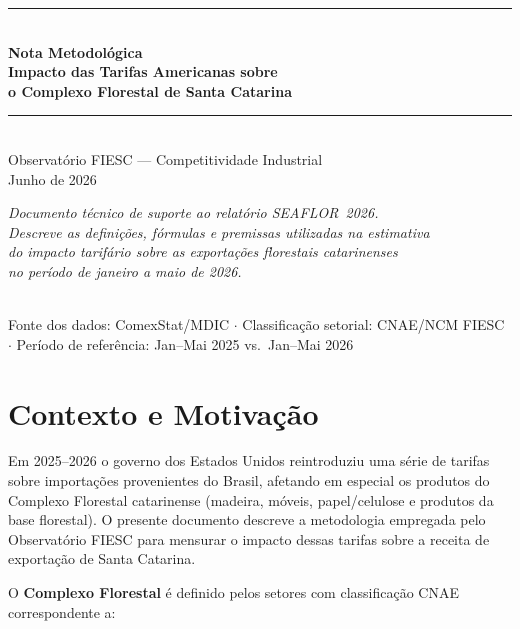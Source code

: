 \documentclass[12pt, a4paper]{article}
\begin{document}
\begin{titlepage}
  \centering
  \vspace*{2cm}
  {\color{azulFIESC}\rule{\linewidth}{2pt}}\\[0.4cm]
  {\LARGE\bfseries\color{azulFIESC}
    Nota Metodológica\\[0.3cm]
    Impacto das Tarifas Americanas sobre\\
    o Complexo Florestal de Santa Catarina
  }\\[0.3cm]
  {\color{azulFIESC}\rule{\linewidth}{1pt}}\\[1.5cm]
  {\large\color{cinzaTexto}
    Observatório FIESC — Competitividade Industrial\\[0.3cm]
    Junho de 2026
  }\\[3cm]
  \begin{minipage}{0.9\textwidth}
    \centering\itshape\color{cinzaTexto}
    Documento técnico de suporte ao relatório SEAFLOR~2026.\\
    Descreve as definições, fórmulas e premissas utilizadas na estimativa\\
    do impacto tarifário sobre as exportações florestais catarinenses\\
    no período de janeiro a maio de 2026.
  \end{minipage}\\[2cm]
  {\footnotesize\color{cinzaTexto}
    Fonte dos dados: ComexStat/MDIC $\cdot$
    Classificação setorial: CNAE/NCM FIESC $\cdot$
    Período de referência: Jan--Mai 2025 vs.\ Jan--Mai 2026
  }
\end{titlepage}

\tableofcontents
\newpage

\section{Contexto e Motivação}

Em 2025--2026 o governo dos Estados Unidos reintroduziu uma série de tarifas
sobre importações provenientes do Brasil, afetando em especial os produtos do
Complexo Florestal catarinense (madeira, móveis, papel/celulose e produtos
da base florestal). O presente documento descreve a metodologia empregada
pelo Observatório FIESC para mensurar o impacto dessas tarifas sobre a
receita de exportação de Santa Catarina.

O \textbf{Complexo Florestal} é definido pelos setores com classificação
CNAE correspondente a:
\end{document}
